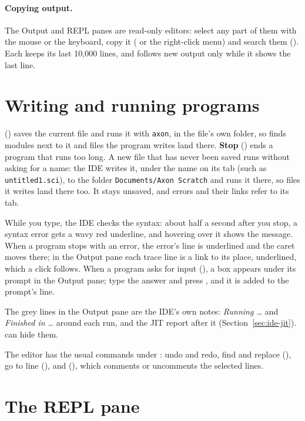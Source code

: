 \documentclass[11pt,a4paper,openany]{report}
\begin{document}
\paragraph{Copying output.} The Output and REPL panes are read-only editors:
select any part of them with the mouse or the keyboard, copy it (
or the right-click menu) and search them (). Each keeps its last
10{,}000 lines, and follows new output only while it shows the last line.

\section{Writing and running programs}

 () saves the current file and runs it with
\texttt{axon}, in the file's own folder, so  finds modules next to
it and files the program writes land there. \textbf{Stop} () ends a
program that runs too long. A new file that has never been saved runs without
asking for a name: the IDE writes it, under the name on its tab (such as
\texttt{untitled1.sci}), to the folder \texttt{Documents/Axon Scratch} and runs it
there, so files it writes land there too. It stays unsaved, and errors and
their links refer to its tab.

While you type, the IDE checks the syntax: about half a second after you stop, a
syntax error gets a wavy red underline, and hovering over it shows the message.
When a program stops with an error, the error's line is underlined and the caret
moves there; in the Output pane each trace line is a link to its place,
underlined, which a click follows. When a
program asks for input (), a box appears under its
prompt in the Output pane; type the answer and press , and it is
added to the prompt's line.

The grey lines in the Output pane are the IDE's own notes: \emph{Running \ldots}
and \emph{Finished in \ldots} around each run, and the JIT report after it
(Section~\ref{sec:ide-jit}).  can hide them.

The editor has the usual commands under : undo and redo, find and
replace (), go to line (), and 
(), which comments or uncomments the selected lines.

\section{The REPL pane}
\end{document}
